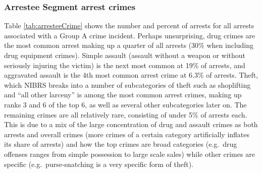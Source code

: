 \documentclass[
  12pt,
  openany]{book}
\begin{document}
\hypertarget{arrestee-segment-arrest-crimes}{%
\subsubsection{Arrestee Segment arrest crimes}\label{arrestee-segment-arrest-crimes}}

Table \ref{tab:arresteeCrime} shows the number and percent of arrests for all arrests associated with a Group A crime incident. Perhaps unsurprising, drug crimes are the most common arrest making up a quarter of all arrests (30\% when including drug equipment crimes). Simple assault (assault without a weapon or without seriously injuring the victim) is the next most common at 19\% of arrests, and aggravated assault is the 4th most common arrest crime at 6.3\% of arrests. Theft, which NIBRS breaks into a number of subcategories of theft such as shoplifting and ``all other larceny'' is among the most common arrest crimes, making up ranks 3 and 6 of the top 6, as well as several other subcategories later on. The remaining crimes are all relatively rare, consisting of under 5\% of arrests each. This is due to a mix of the large concentration of drug and assault crimes as both arrests and overall crimes (more crimes of a certain category artificially inflates its share of arrests) and how the top crimes are broad categories (e.g.~drug offenses ranges from simple possession to large scale sales) while other crimes are specific (e.g.~purse-snatching is a very specific form of theft).
\end{document}
